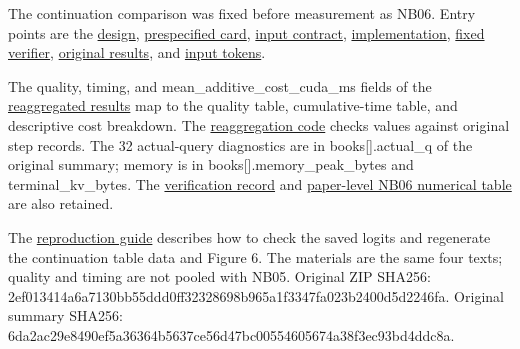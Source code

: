 \documentclass[10pt,a4paper]{article}
\begin{document}
The continuation comparison was fixed before measurement as NB06. Entry points are the \href{https://github.com/metaSATOKEN/nsn/blob/c37d39ea0106274d9f661cfbb268b0ed05319846/plans/loop-kv-nb06-design-v0.1-2026-10-08.md}{design}, \href{https://github.com/metaSATOKEN/nsn/blob/c37d39ea0106274d9f661cfbb268b0ed05319846/plans/prespecified/loop-kv-nb06-v0.1-2026-10-08.md}{prespecified card}, \href{https://github.com/metaSATOKEN/nsn/blob/c37d39ea0106274d9f661cfbb268b0ed05319846/plans/loop-kv-nb06-input-contract-v0.1-2026-10-08.json}{input contract}, \href{https://github.com/metaSATOKEN/nsn/blob/c37d39ea0106274d9f661cfbb268b0ed05319846/scripts/loop_kv_nb06.py}{implementation}, \href{https://github.com/metaSATOKEN/nsn/blob/c37d39ea0106274d9f661cfbb268b0ed05319846/scripts/verify_loop_kv_nb06.py}{fixed verifier}, \href{https://github.com/metaSATOKEN/nsn/blob/c37d39ea0106274d9f661cfbb268b0ed05319846/runs/loop-kv-nb06-20261008-075410-5621380a/summary.json}{original results}, and \href{https://github.com/metaSATOKEN/nsn/blob/c37d39ea0106274d9f661cfbb268b0ed05319846/runs/loop-kv-nb06-20261008-075410-5621380a/materials.json}{input tokens}.

The quality, timing, and mean\_additive\_cost\_cuda\_ms fields of the \href{https://github.com/metaSATOKEN/nsn/blob/c37d39ea0106274d9f661cfbb268b0ed05319846/reports/nb06-results-v0.1-2026-10-08.json}{reaggregated results} map to the quality table, cumulative-time table, and descriptive cost breakdown. The \href{https://github.com/metaSATOKEN/nsn/blob/c37d39ea0106274d9f661cfbb268b0ed05319846/scripts/analyze_loop_kv_nb06_results.py}{reaggregation code} checks values against original step records. The 32 actual-query diagnostics are in books{[}{]}.actual\_q of the original summary; memory is in books{[}{]}.memory\_peak\_bytes and terminal\_kv\_bytes. The \href{https://github.com/metaSATOKEN/nsn/blob/c37d39ea0106274d9f661cfbb268b0ed05319846/data/validation/nb06/verification-summary.json}{verification record} and \href{https://github.com/metaSATOKEN/nsn/blob/c37d39ea0106274d9f661cfbb268b0ed05319846/papers/nsn-integrated/data/numerical-audit-nb06-v0.1-2026-10-08.json}{paper-level NB06 numerical table} are also retained.

The \href{https://github.com/metaSATOKEN/nsn/blob/c37d39ea0106274d9f661cfbb268b0ed05319846/REPRODUCIBILITY.md}{reproduction guide} describes how to check the saved logits and regenerate the continuation table data and Figure 6. The materials are the same four texts; quality and timing are not pooled with NB05. Original ZIP SHA256: 2ef013414a6a7130bb55ddd0ff32328698b965a1f3347fa023b2400d5d2246fa. Original summary SHA256: 6da2ac29e8490ef5a36364b5637ce56d47bc00554605674a38f3ec93bd4ddc8a.
\end{document}
